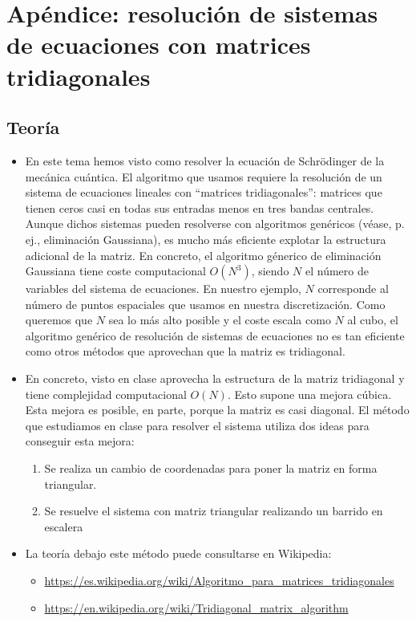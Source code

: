 \documentclass[12pt,spanish]{iopart}
\begin{document}
\section{Apéndice: resolución de sistemas de ecuaciones con matrices tridiagonales}

\subsection{Teoría}

\begin{itemize}
\item En este tema hemos visto como resolver la ecuación de Schrödinger de la mecánica cuántica. El algoritmo que usamos requiere la resolución de un sistema de ecuaciones lineales con ``matrices tridiagonales'': matrices que tienen ceros casi en todas sus entradas menos en tres bandas centrales. Aunque dichos sistemas pueden resolverse con algoritmos genéricos (véase, p. ej., eliminación Gaussiana), es mucho más eficiente explotar la estructura adicional de la matriz. En concreto, el algoritmo génerico de eliminación Gaussiana tiene coste computacional $O(N^3)$, siendo $N$ el número de variables del sistema de ecuaciones. En nuestro ejemplo, $N$ corresponde al número de puntos espaciales que usamos en nuestra discretización. Como queremos que $N$ sea lo más alto posible y el coste escala como $N$ al cubo, el algoritmo genérico de resolución de sistemas de ecuaciones no es tan eficiente como otros métodos que aprovechan que la matriz es tridiagonal.
\item En concreto, visto en clase aprovecha la estructura de la matriz tridiagonal y tiene complejidad computacional $O(N)$. Esto supone una mejora cúbica. Esta mejora es posible, en parte, porque la matriz es casi diagonal. El método que estudiamos en clase para resolver el sistema utiliza dos ideas para conseguir esta mejora:
\begin{enumerate}
\item Se realiza un cambio de coordenadas para poner la matriz en forma triangular.
\item Se resuelve el sistema con matriz triangular realizando un barrido en escalera
\end{enumerate}
\item La teoría debajo este método puede consultarse en Wikipedia:
\begin{itemize}
\item \url{https://es.wikipedia.org/wiki/Algoritmo_para_matrices_tridiagonales}
\item \url{https://en.wikipedia.org/wiki/Tridiagonal_matrix_algorithm}
\end{itemize}
\end{itemize}
\end{document}
